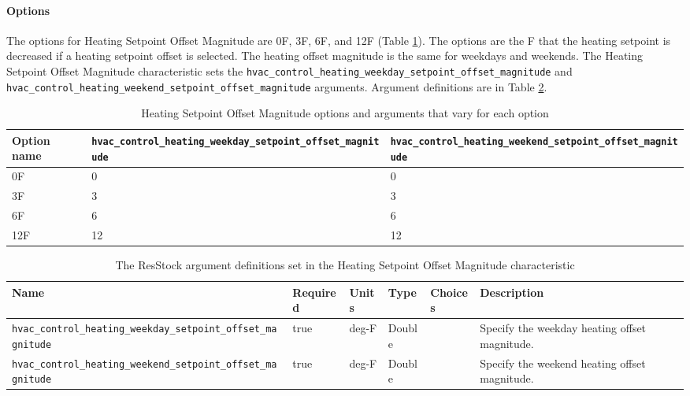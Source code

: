 \paragraph{Options}
The options for Heating Setpoint Offset Magnitude are 0F, 3F, 6F, and 12F (Table \ref{table:hc_opt_ht_stp_mag}). The options are the \degree F that the heating setpoint is decreased if a heating setpoint offset is selected. The heating offset magnitude is the same for weekdays and weekends. The Heating Setpoint Offset Magnitude characteristic sets the \texttt{hvac\_control\_heating\_weekday\_setpoint\_offset\_magnitude} and \texttt{hvac\_control\_heating\_weekend\_setpoint\_offset\_magnitude} arguments. Argument definitions are in Table \ref{table:hc_arg_def_ht_stp_mag}.

\begin{longtable}[]{ |p{}|p{4cm}|p{4cm}| }
\caption{Heating Setpoint Offset Magnitude options and arguments that vary for each option} \label{table:hc_opt_ht_stp_mag} \\  
\toprule\noalign{}
Option name &
\texttt{hvac\_control\_heating\_weekday\_setpoint\_offset\_magnitude} &
\texttt{hvac\_control\_heating\_weekend\_setpoint\_offset\_magnitude} \\
\midrule\noalign{}
\endhead
\bottomrule\noalign{}
\endlastfoot
0F & 0 & 0 \\
3F & 3 & 3 \\
6F & 6 & 6 \\
12F & 12 & 12 \\
\end{longtable}

\begin{longtable}[]{ |p{}|p{1.5cm}|p{1cm}|p{1.1cm}|p{1.4cm}|p{6cm}| }
\caption{The ResStock argument definitions set in the Heating Setpoint Offset Magnitude characteristic} \label{table:hc_arg_def_ht_stp_mag} \\
\toprule\noalign{}
Name & Required & Units & Type & Choices & Description \\
\midrule\noalign{}
\endhead
\bottomrule\noalign{}
\endlastfoot
\texttt{hvac\_control\_heating\_weekday\_setpoint\_offset\_magnitude} &
true & deg-F & Double & & Specify the weekday heating offset
magnitude. \\
\hline
\texttt{hvac\_control\_heating\_weekend\_setpoint\_offset\_magnitude} &
true & deg-F & Double & & Specify the weekend heating offset
magnitude. \\
\end{longtable}

